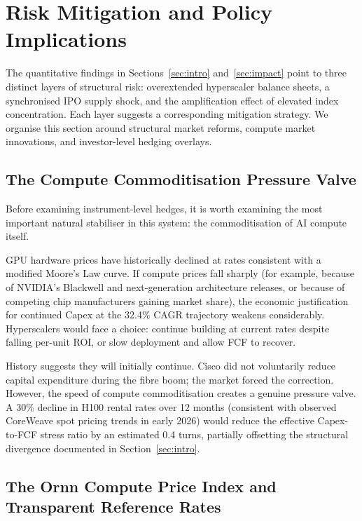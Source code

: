 
\section{Risk Mitigation and Policy Implications}
\label{sec:mitigation}

The quantitative findings in Sections~\ref{sec:intro} and~\ref{sec:impact} point to
three distinct layers of structural risk: overextended hyperscaler balance sheets, a
synchronised IPO supply shock, and the amplification effect of elevated index
concentration. Each layer suggests a corresponding mitigation strategy. We organise
this section around structural market reforms, compute market innovations, and
investor-level hedging overlays.

\subsection{The Compute Commoditisation Pressure Valve}

Before examining instrument-level hedges, it is worth examining the most important
natural stabiliser in this system: the commoditisation of AI compute itself.

GPU hardware prices have historically declined at rates consistent with a modified
Moore's Law curve. If compute prices fall sharply (for example, because of NVIDIA's
Blackwell and next-generation architecture releases, or because of competing chip
manufacturers gaining market share), the economic justification for continued Capex
at the 32.4\% CAGR trajectory weakens considerably. Hyperscalers would face a choice:
continue building at current rates despite falling per-unit ROI, or slow deployment
and allow FCF to recover.

History suggests they will initially continue. Cisco did not voluntarily reduce capital
expenditure during the fibre boom; the market forced the correction. However, the speed
of compute commoditisation creates a genuine pressure valve. A 30\% decline in H100
rental rates over 12 months (consistent with observed CoreWeave spot pricing trends in
early 2026) would reduce the effective Capex-to-FCF stress ratio by an estimated
0.4 turns, partially offsetting the structural divergence documented in Section~\ref{sec:intro}.

\subsection{The Ornn Compute Price Index and Transparent Reference Rates}

